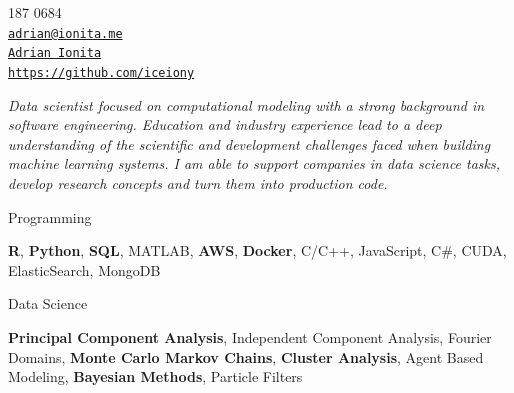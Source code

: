 \documentclass[11pt,article,oneside]{memoir}
\makeatletter
\def\myauthor{Adrian Ionita}
\def\myemail{adrian@ionita.me}
\def\myweb{https://github.com/iceiony}
\def\myphone{0797 187 0684}
\def\mytwitter{@iceiony}
\def\mylinkedin{https://uk.linkedin.com/in/adrian-ionita-6a923129}
\makeatother
\begin{document}
%
\hfill
\begin{minipage}[t]{1.3in}
  \flushright \footnotesize  \contactblock \myphone \, \faPhone \\ 
  {\scriptsize  \texttt{\href{mailto:\myemail}{\myemail}} \, \faEnvelope} \\
  {\scriptsize  \texttt{\href{\mylinkedin}{\myauthor}} \, \faLinkedinSquare }  \\ 
  {\scriptsize  \texttt{\href{\myweb}{\myweb}} \, \faGithub}
\end{minipage}

{\vskip -0.8cm}
\reversemarginpar

\bigskip      
\medskip

\noindent\emph{Data scientist focused on computational modeling with a strong background in software engineering.
Education and industry experience lead to a deep understanding of the scientific and development challenges faced when building machine learning systems.
I am able to support companies in data science tasks, develop research concepts and turn them into production code.
}
\bigskip


\ind Programming

\ind \hspace{0.354in} \footnotesize  \textbf{R}, \textbf{Python}, \textbf{SQL}, MATLAB, \textbf{AWS}, \textbf{Docker}, C/C++, JavaScript, C\#, CUDA, ElasticSearch, MongoDB \normalsize 

\ind Data Science

\ind \hspace{0.354in} \footnotesize \textbf{Principal Component Analysis}, Independent Component Analysis, Fourier Domains,
\textbf{Monte Carlo Markov Chains}, \textbf{Cluster Analysis}, Agent Based Modeling, \textbf{Bayesian Methods}, Particle Filters \normalsize
\end{document}
